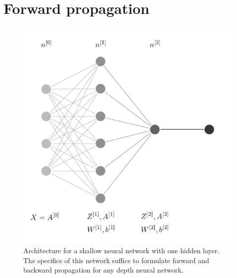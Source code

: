 \documentclass[aps,10pt]{revtex4}
\theoremstyle{plain}
\theoremstyle{definition}
\theoremstyle{remark}
\begin{document}
\section{Forward propagation}

\begin{figure}[h]
	\centering
	\includegraphics[width=0.7\linewidth]{nn_diagram_2_layers}
	\caption{Architecture for a shallow neural network with one hidden layer. The specifics of this network suffice to formulate forward and backward propagation for any depth neural network.}
	\label{fig:nndiagram2layers}
\end{figure}
\end{document}
